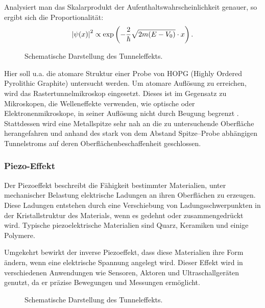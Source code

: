 \documentclass{article}
\newcommand{\defc}{black}
\newcommand{\colorT}[2][blue]{\color{#1}{#2}\color{\defc}}
\newcommand{\todo}[1]{\colorT[red]{\textbf{(#1)}}}
\begin{document}
Analysiert man das Skalarprodukt der Aufenthaltswahrscheinlichkeit genauer, so ergibt sich die Proportionalität:
\begin{align*}
    \abs{\psi(x)}^2 \propto \exp\left(-\frac{2}{\hbar} \sqrt{2m (E - V_0)} \cdot x\right).
\end{align*}

\begin{figure}[h!]
    \centering
    \caption{Schematische Darstellung des Tunneleffekts.}
    \label{fig:tunneleffekt}
\end{figure}

Hier soll u.a. die atomare Struktur einer Probe von HOPG (Highly Ordered Pyrolithic Graphite) untersucht werden. Um atomare Auflösung zu erreichen, wird das Rastertunnelmikroskop eingesetzt. Dieses ist im Gegensatz zu Mikroskopen, die Welleneffekte verwenden, wie optische oder Elektronenmikroskope,
in seiner Auflösung nicht durch Beugung begrenzt \todo{Quelle?}.
Stattdessen wird eine Metallspitze sehr nah an die zu untersuchende Oberfläche 
herangefahren und anhand des stark von dem Abstand Spitze--Probe abhängigen Tunnelstroms auf deren Oberflächenbeschaffenheit geschlossen.

\subsubsection*{Piezo-Effekt}
Der Piezoeffekt beschreibt die Fähigkeit bestimmter Materialien, unter mechanischer Belastung elektrische Ladungen an ihren Oberflächen zu erzeugen. Diese Ladungen entstehen durch eine Verschiebung von Ladungsschwerpunkten in der Kristallstruktur des Materials, wenn es gedehnt oder zusammengedrückt wird. Typische piezoelektrische Materialien sind Quarz, Keramiken und einige Polymere.

Umgekehrt bewirkt der inverse Piezoeffekt, dass diese Materialien ihre Form ändern, wenn eine elektrische Spannung angelegt wird. Dieser Effekt wird in verschiedenen Anwendungen wie Sensoren, Aktoren und Ultraschallgeräten genutzt, da er präzise Bewegungen und Messungen ermöglicht.

\begin{figure}[h!]
    \centering
    \caption{Schematische Darstellung des Tunneleffekts.}
    \label{fig:tunneleffekt}
\end{figure}
\end{document}
